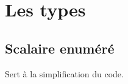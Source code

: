 

    
    
    
    
    
    



\section{Les types}


    \subsection{Scalaire enuméré}
    Sert à la simplification du code.


